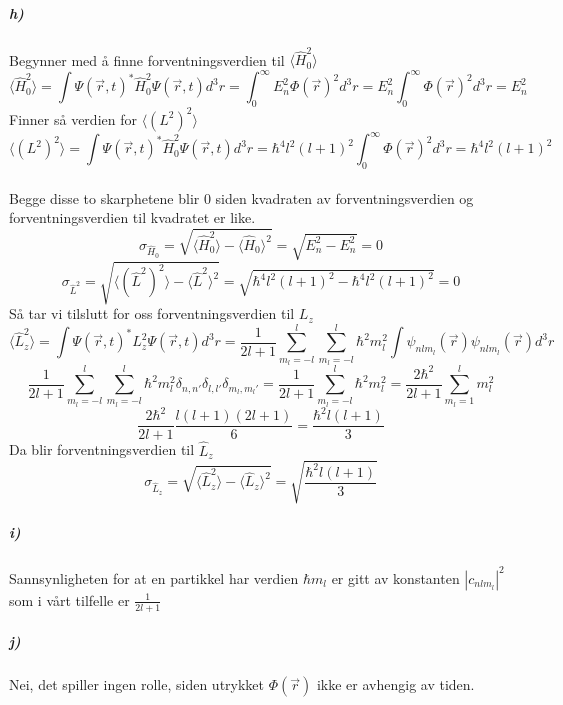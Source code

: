 \documentclass[11pt, A4paper,norsk]{article}
\begin{document}
			\subparagraph{h)}
				\begin{flushleft}
Begynner med å finne forventningsverdien til $\langle \hat{H}_0^2 \rangle$
$$\langle \hat{H}_0^2 \rangle = \int \Psi(\vec{r}, t)^{*} \hat{H}_0^2 \Psi(\vec{r}, t) d^3r = \int_{0}^{\infty} E_n^2 \Phi(\vec{r})^2 d^3r = E_n^2 \int_{0}^{\infty} \Phi(\vec{r})^2 d^3r = E_n^2$$
Finner så verdien for $\langle (L^2)^2 \rangle$
$$\langle (L^2)^2 \rangle = \int \Psi(\vec{r}, t)^{*} \hat{H}_0^2 \Psi(\vec{r}, t) d^3r = \hbar^4 l^2(l + 1)^2 \int_{0}^{\infty} \Phi(\vec{r})^2 d^3r = \hbar^4 l^2(l + 1)^2$$ \\
Begge disse to skarphetene blir $0$ siden kvadraten av forventningsverdien og forventningsverdien til kvadratet er like.
$$\sigma_{\hat{H}_0} = \sqrt{\langle \hat{H}_0^2 \rangle - \langle \hat{H}_0 \rangle^2} = \sqrt{E_n^2 - E_n^2} = 0$$
$$\sigma_{\hat{L}^2} = \sqrt{\langle (\hat{L}^2)^2 \rangle - \langle \hat{L}^2 \rangle^2} = \sqrt{\hbar^4 l^2(l + 1)^2 - \hbar^4 l^2(l + 1)^2} = 0$$
Så tar vi tilslutt for oss forventningsverdien til $L_z$
$$\langle \hat{L}_z^2 \rangle = \int \Psi(\vec{r}, t)^{*} L_z^2 \Psi(\vec{r}, t) d^3r = \frac{1}{2l + 1} \sum_{m_l = -l}^{l} \sum_{m_l = -l}^{l} \hbar^2 m_l^2 \int \psi_{nlm_{l}}(\vec{r})  \psi_{nlm_{l}}(\vec{r}) d^3r$$
$$\frac{1}{2l + 1} \sum_{m_l = -l}^{l} \sum_{m_l = -l}^{l} \hbar^2 m_l^2 \delta_{n, n'} \delta_{l, l'} \delta_{m_l, m_l'} = \frac{1}{2l + 1} \sum_{m_l = -l}^{l} \hbar^2 m_l^2 = \frac{2 \hbar^2}{2l + 1} \sum_{m_l = 1}^{l} m_l^2$$
$$\frac{2 \hbar^2}{2l + 1} \frac{l (l + 1)(2l + 1)}{6} = \frac{\hbar^2 l (l + 1)}{3}$$
Da blir forventningsverdien til $\hat{L}_z$
$$\sigma_{\hat{L}_z} = \sqrt{\langle \hat{L}_z^2 \rangle - \langle \hat{L}_z \rangle^2} = \sqrt{\frac{\hbar^2 l (l + 1)}{3}}$$
				\end{flushleft}












			\subparagraph{i)}
				\begin{flushleft}
Sannsynligheten for at en partikkel har verdien $\hbar m_l$ er gitt av konstanten $|c_{nlm_l}|^2$ som i vårt tilfelle er $\frac{1}{2l + 1}$
				\end{flushleft}









			\subparagraph{j)}
				\begin{flushleft}
Nei, det spiller ingen rolle, siden utrykket $\Phi(\vec{r})$ ikke er avhengig av tiden.
				\end{flushleft}
\end{document}
